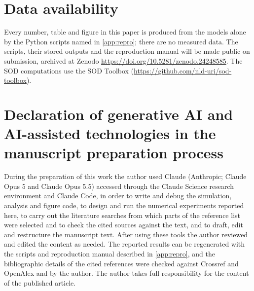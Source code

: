 \documentclass[preprint,12pt]{elsarticle}
\begin{document}
\section*{Data availability}
Every number, table and figure in this paper is produced from the models alone by the Python scripts named in \ref{app:repro}; there are no measured data. The scripts, their stored outputs and the reproduction manual will be made public on submission, archived at Zenodo \url{https://doi.org/10.5281/zenodo.24248585}. The SOD computations use the SOD Toolbox (\url{https://github.com/nld-uri/sod-toolbox}).

\section*{Declaration of generative AI and AI-assisted technologies in the manuscript preparation process}
During the preparation of this work the author used Claude (Anthropic; Claude Opus 5 and Claude Opus 5.5) accessed through the Claude Science research environment and Claude Code, in order to write and debug the simulation, analysis and figure code, to design and run the numerical experiments reported here, to carry out the literature searches from which parts of the reference list were selected and to check the cited sources against the text, and to draft, edit and restructure the manuscript text. After using these tools the author reviewed and edited the content as needed. The reported results can be regenerated with the scripts and reproduction manual described in \ref{app:repro}, and the bibliographic details of the cited references were checked against Crossref and OpenAlex and by the author. The author takes full responsibility for the content of the published article.



\end{document}
